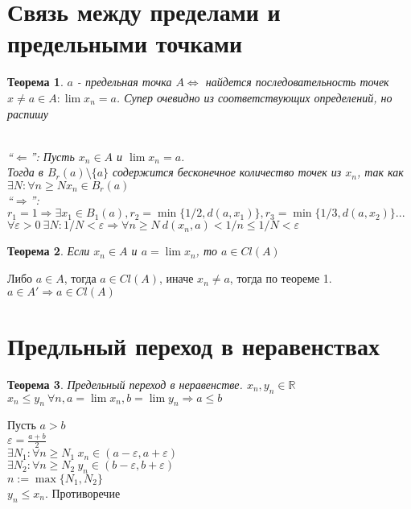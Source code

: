 \documentclass[12pt,letterpaper]{report}
\makeatletter
\newtheorem*{theorem-non}{Теорема}
\theoremstyle{definition}
\renewenvironment{proof}[1][\proofname]{%
   \par\pushQED{\qed}\normalfont%
   \topsep6\p@\@plus6\p@\relax
   \trivlist\item[\hskip\labelsep\bfseries#1\@addpunct{.}]%
   \ignorespaces
}{%
   \popQED\endtrivlist\@endpefalse
}
\makeatother
\begin{document}
    \section{Связь между пределами и предельными точками}
    
    \begin{theorem-non}
        $a$ - предельная точка $A \Longleftrightarrow$ найдется последовательность точек $x\neq a \in A : \lim x_n = a$. Супер очевидно из соответствующих определений, но распишу
        \begin{proof}
            \quad \\
            ``$\Longleftarrow$'': \quad Пусть $x_n \in A$ и $\lim x_n = a$. \\
            Тогда в $B_r(a)\setminus \{a\}$ содержится бесконечное количество точек из $x_n$, так как $\exists N : \forall n \geq N x_n \in B_r(a)$ \\
            ``$\Longrightarrow$'': \quad
            $r_1 = 1 \Longrightarrow \exists x_1 \in B_1(a), r_2 = \min\{1/2, d(a, x_1)\}, r_3=\min\{1/3, d(a, x_2)\}...$ \\
            $\forall \varepsilon>0\ \exists N: 1/N<\varepsilon \Longrightarrow \forall n\geq N\ d(x_n, a) < 1/n \leq 1/N < \varepsilon$
        \end{proof}
    \end{theorem-non}
    
    
    
    \begin{theorem-non}
        Если $x_n \in A$ и $a=\lim x_n$, то $a \in Cl(A)$
    \end{theorem-non}
    \begin{proof}
        Либо $a\in A$, тогда $a \in Cl(A)$, иначе $x_n \neq a$, тогда по теореме 1. $a \in A' \Longrightarrow a \in Cl(A)$
    \end{proof}

    \section{Предльный переход в неравенствах}

    
    \begin{theorem-non}
        Предельный переход в неравенстве. $x_n, y_n \in \mathbb{R}$ \\
        $x_n \leq y_n\ \forall n, a=\lim x_n, b=\lim y_n \Longrightarrow a\leq b$
    \end{theorem-non}
        
    \begin{proof}
        Пусть $a>b$ \\
        $\varepsilon = \frac{a+b}{2}$ \\
        $\exists N_1: \forall n\geq N_1\ x_n\in (a-\varepsilon, a+\varepsilon)$ \\
        $\exists N_2: \forall n\geq N_2\ y_n \in (b-\varepsilon, b+\varepsilon)$ \\
        $n:=\max\{N_1, N_2\}$ \\
        $y_n \leq x_n$. Противоречие
    \end{proof}
    
\end{document}

